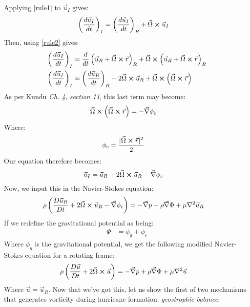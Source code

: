 Applying \ref{rule1} to $\vec{u}_I$ gives:
\begin{align*}
    \left(\frac{d\vec{u}_I}{dt}\right)_I &= \left(\frac{d\vec{u}_I}{dt}\right)_R+\vec{\Omega}\cross\vec{u}_I
\end{align*}
Then, using \ref{rule2} gives:
\begin{align*}
    \left(\frac{d\vec{u}_I}{dt}\right)_I &= \frac{d}{dt}\left(\vec{u}_R+\vec{\Omega}\cross\vec{r}\right)_R+\vec{\Omega}\cross\left(\vec{u}_R+\vec{\Omega}\cross\vec{r}\right)_R\\
    \left(\frac{d\vec{u}_I}{dt}\right)_I &= \left(\frac{d\vec{u}_R}{dt}\right)_R+2\vec{\Omega}\cross\vec{u}_R+\vec{\Omega}\cross\left(\vec{\Omega}\cross\vec{r}\right)
\end{align*}
As per Kundu \cite{cohen2004fluid} \textit{Ch. 4, section 11}, this last term may become:
\begin{align*}
    \vec{\Omega}\cross\left(\vec{\Omega}\cross\vec{r}\right) &= -\vec{\nabla}\phi_c
\end{align*}
Where:
\begin{align*}
    \phi_c &= \frac{\vert \vec{\Omega}\cross\vec{r}\vert^2}{2}
\end{align*}
Our equation therefore becomes:
\begin{align*}
    \vec{a}_I &= \vec{a}_R+2\vec{\Omega}\cross\vec{u}_R-\vec{\nabla}\phi_c
\end{align*}
Now, we input this in the Navier-Stokes equation:
\begin{align*}
    \rho\left(\frac{D\vec{u}_R}{Dt}+2\vec{\Omega}\cross\vec{u}_R-\vec{\nabla}\phi_c\right) &=-\vec{\nabla}p+\rho\vec{\nabla}\Phi+\mu\nabla^2 \vec{u}_R 
\end{align*}
If we redefine the gravitational potential as being:
\begin{align*}
    \Phi &= \phi_g+\phi_c
\end{align*}
Where $\phi_g$ is the gravitational potential, we get the following modified Navier-Stokes equation for a rotating frame:
\begin{align*}
    \rho\left(\frac{D\vec{u}}{Dt}+2\vec{\Omega}\cross\vec{u}\right) &=-\vec{\nabla}p+\rho\vec{\nabla}\Phi+\mu\nabla^2 \vec{u} 
\end{align*}
Where $\vec{u}=\vec{u}_R$. Now that we've got this, let us show the first of two mechanisms that generates vorticity during hurricane formation: \textit{geostrophic balance}.

